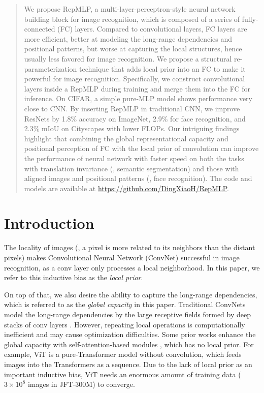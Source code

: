 \documentclass[10pt,twocolumn,letterpaper]{article}
\begin{document}
\begin{abstract} 
	We propose RepMLP, a multi-layer-perceptron-style neural network building block for image recognition, which is composed of a series of fully-connected (FC) layers. Compared to convolutional layers, FC layers are more efficient, better at modeling the long-range dependencies and positional patterns, but worse at capturing the local structures, hence usually less favored for image recognition. We propose a structural re-parameterization technique that adds local prior into an FC to make it powerful for image recognition. Specifically, we construct convolutional layers inside a RepMLP during training and merge them into the FC for inference. On CIFAR, a simple pure-MLP model shows performance very close to CNN. By inserting RepMLP in traditional CNN, we improve ResNets by 1.8\% accuracy on ImageNet, 2.9\% for face recognition, and 2.3\% mIoU on Cityscapes with lower FLOPs. Our intriguing findings highlight that combining the global representational capacity and positional perception of FC with the local prior of convolution can improve the performance of neural network with faster speed on both the tasks with translation invariance (\eg, semantic segmentation) and those with aligned images and positional patterns (\eg, face recognition). The code and models are available at \url{https://github.com/DingXiaoH/RepMLP}.
\end{abstract}




\section{Introduction}

The locality of images (\ie, a pixel is more related to its neighbors than the distant pixels) makes Convolutional Neural Network (ConvNet) successful in image recognition, as a conv layer only processes a local neighborhood. In this paper, we refer to this inductive bias as the \textit{local prior}.

On top of that, we also desire the ability to capture the long-range dependencies, which is referred to as the \textit{global capacity} in this paper. Traditional ConvNets model the long-range dependencies by the large receptive fields formed by deep stacks of conv layers \cite{wang2018non}. However, repeating local operations is computationally inefficient and may cause optimization difficulties. Some prior works enhance the global capacity with self-attention-based modules \cite{wang2018non,dosovitskiy2020image,vaswani2017attention}, which has no local prior. For example, ViT \cite{dosovitskiy2020image} is a pure-Transformer model without convolution, which feeds images into the Transformers as a sequence. Due to the lack of local prior as an important inductive bias, ViT needs an enormous amount of training data ($3\times10^8$ images in JFT-300M) to converge.
\end{document}
